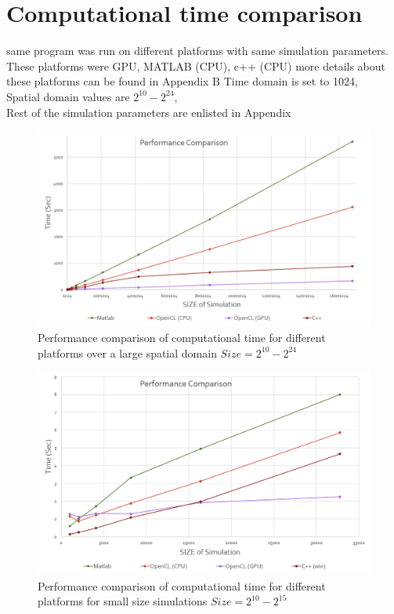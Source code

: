 \section{Computational time comparison}
same program was run on different platforms with same simulation parameters. These platforms were GPU, MATLAB (CPU), c++ (CPU) more details about these platforms can be found in Appendix B %
Time domain is set to 1024,\\
Spatial domain values are $2^{10} - 2^{24}$,\\
Rest of the simulation parameters are enlisted in Appendix %
\begin{figure}[htbp]
	\centering
		\includegraphics[width=6in]{Figures/g1.png}
	\caption[Computational Time on different platforms]{Performance comparison of computational time for different platforms over a large spatial domain $ Size = 2^{10} - 2^{24}$ }
	\label{g1}
\end{figure}
\begin{figure}[htbp]
	\centering
		\includegraphics[width=6in]{Figures/g2.png}
	\caption[Computational Time on different platforms 2]{Performance comparison of computational time for different platforms for small size simulations $ Size = 2^{10} - 2^{15}$}
	\label{g2}
\end{figure}
